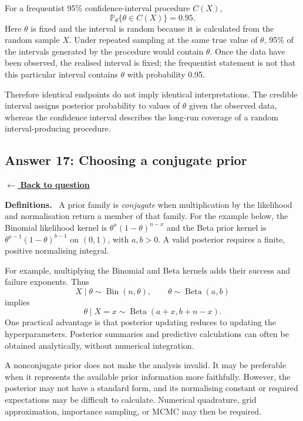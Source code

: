 \documentclass[11pt,a4paper]{article}
\newcommand{\answernav}[1]{%
  \label{answer:#1}%
  \noindent\hyperref[question:#1]{$\leftarrow$ \textbf{Back to question}}%
  \par\smallskip}
\newcommand{\studyheading}[1]{%
  \par\medskip\noindent\textcolor{statblue}{\textbf{#1.}}\ }
\begin{document}
For a frequentist 95\% confidence-interval procedure $C(X)$,
\[
\boxed{
\mathbb{P}_{\theta}\{\theta\in C(X)\}=0.95.
}
\]
Here $\theta$ is fixed and the interval is random because it is calculated
from the random sample $X$. Under repeated sampling at the same true value of
$\theta$, 95\% of the intervals generated by the procedure would contain
$\theta$. Once the data have been observed, the realised interval is fixed;
the frequentist statement is not that this particular interval contains
$\theta$ with probability 0.95.

Therefore identical endpoints do not imply identical interpretations. The
credible interval assigns posterior probability to values of $\theta$ given
the observed data, whereas the confidence interval describes the long-run
coverage of a random interval-producing procedure.

\clearpage

\subsection{Answer 17: Choosing a conjugate prior}
\answernav{17}

\studyheading{Definitions}
A prior family is \emph{conjugate} when multiplication by the likelihood and normalisation return a member of that family.
For the example below, the Binomial likelihood kernel is $\theta^x(1-\theta)^{n-x}$ and the Beta prior kernel is $\theta^{a-1}(1-\theta)^{b-1}$ on $(0,1)$, with $a,b>0$.
A valid posterior requires a finite, positive normalising integral.

For example, multiplying the Binomial and Beta kernels adds their success and failure exponents. Thus
\[
X\mid\theta\sim\operatorname{Bin}(n,\theta),
\qquad
\theta\sim\operatorname{Beta}(a,b)
\]
implies
\[
\theta\mid X=x
\sim\operatorname{Beta}(a+x,b+n-x).
\]
One practical advantage is that posterior updating reduces to updating the
hyperparameters. Posterior summaries and predictive calculations can often be
obtained analytically, without numerical integration.

A nonconjugate prior does not make the analysis invalid. It may be preferable
when it represents the available prior information more faithfully. However,
the posterior may not have a standard form, and its normalising constant or
required expectations may be difficult to calculate. Numerical quadrature,
grid approximation, importance sampling, or MCMC may then be required.

\clearpage
\end{document}
